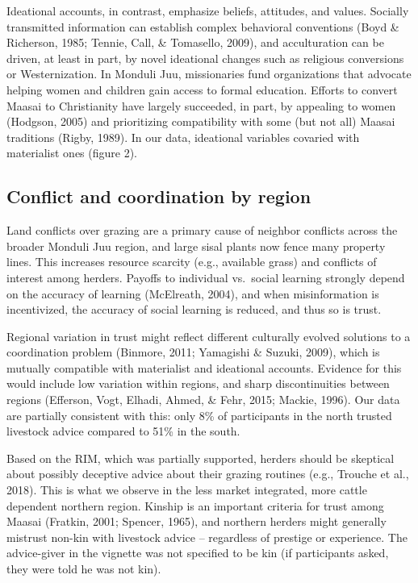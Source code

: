 \documentclass[
  11pt,
]{article}
\begin{document}
Ideational accounts, in contrast, emphasize beliefs, attitudes, and
values. Socially transmitted information can establish complex
behavioral conventions (Boyd \& Richerson, 1985; Tennie, Call, \&
Tomasello, 2009), and acculturation can be driven, at least in part, by
novel ideational changes such as religious conversions or
Westernization. In Monduli Juu, missionaries fund organizations that
advocate helping women and children gain access to formal education.
Efforts to convert Maasai to Christianity have largely succeeded, in
part, by appealing to women (Hodgson, 2005) and prioritizing
compatibility with some (but not all) Maasai traditions (Rigby, 1989).
In our data, ideational variables covaried with materialist ones (figure
2).

\hypertarget{conflict-and-coordination-by-region}{%
\subsection{Conflict and coordination by
region}\label{conflict-and-coordination-by-region}}

Land conflicts over grazing are a primary cause of neighbor conflicts
across the broader Monduli Juu region, and large sisal plants now fence
many property lines. This increases resource scarcity (e.g., available
grass) and conflicts of interest among herders. Payoffs to individual
vs.~social learning strongly depend on the accuracy of learning
(McElreath, 2004), and when misinformation is incentivized, the accuracy
of social learning is reduced, and thus so is trust.

Regional variation in trust might reflect different culturally evolved
solutions to a coordination problem (Binmore, 2011; Yamagishi \& Suzuki,
2009), which is mutually compatible with materialist and ideational
accounts. Evidence for this would include low variation within regions,
and sharp discontinuities between regions (Efferson, Vogt, Elhadi,
Ahmed, \& Fehr, 2015; Mackie, 1996). Our data are partially consistent
with this: only 8\% of participants in the north trusted livestock
advice compared to 51\% in the south.

Based on the RIM, which was partially supported, herders should be
skeptical about possibly deceptive advice about their grazing routines
(e.g., Trouche et al., 2018). This is what we observe in the less market
integrated, more cattle dependent northern region. Kinship is an
important criteria for trust among Maasai (Fratkin, 2001; Spencer,
1965), and northern herders might generally mistrust non-kin with
livestock advice -- regardless of prestige or experience. The
advice-giver in the vignette was not specified to be kin (if
participants asked, they were told he was not kin).
\end{document}
